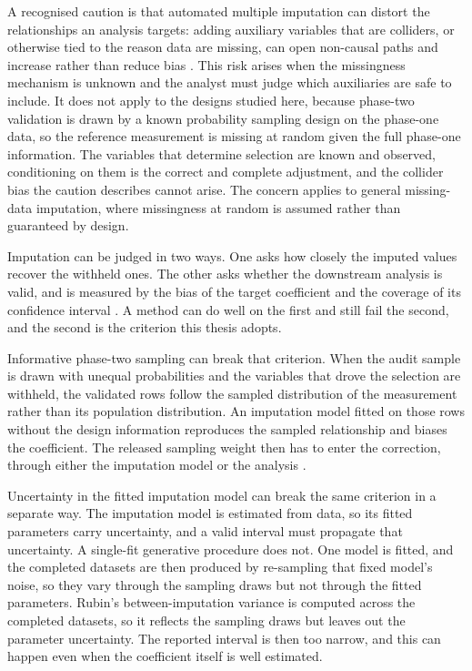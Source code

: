 A recognised caution is that automated multiple imputation can distort the relationships an analysis targets: adding auxiliary variables that are colliders, or otherwise tied to the reason data are missing, can open non-causal paths and increase rather than reduce bias \citep{thoemmes2014cautious}. This risk arises when the missingness mechanism is unknown and the analyst must judge which auxiliaries are safe to include. It does not apply to the designs studied here, because phase-two validation is drawn by a known probability sampling design on the phase-one data, so the reference measurement is missing at random given the full phase-one information. The variables that determine selection are known and observed, conditioning on them is the correct and complete adjustment, and the collider bias the caution describes cannot arise. The concern applies to general missing-data imputation, where missingness at random is assumed rather than guaranteed by design.

Imputation can be judged in two ways. One asks how closely the imputed values recover the withheld ones. The other asks whether the downstream analysis is valid, and is measured by the bias of the target coefficient and the coverage of its confidence interval \citep{naf2023imputation, Rubin1987, meng1994multiple}. A method can do well on the first and still fail the second, and the second is the criterion this thesis adopts.

Informative phase-two sampling can break that criterion. When the audit sample is drawn with unequal probabilities and the variables that drove the selection are withheld, the validated rows follow the sampled distribution of the measurement rather than its population distribution. An imputation model fitted on those rows without the design information reproduces the sampled relationship and biases the coefficient. The released sampling weight then has to enter the correction, through either the imputation model or the analysis \citep{lumley2011complex}.

Uncertainty in the fitted imputation model can break the same criterion in a separate way. The imputation model is estimated from data, so its fitted parameters carry uncertainty, and a valid interval must propagate that uncertainty. A single-fit generative procedure does not. One model is fitted, and the completed datasets are then produced by re-sampling that fixed model's noise, so they vary through the sampling draws but not through the fitted parameters. Rubin's between-imputation variance is computed across the completed datasets, so it reflects the sampling draws but leaves out the parameter uncertainty. The reported interval is then too narrow, and this can happen even when the coefficient itself is well estimated.

